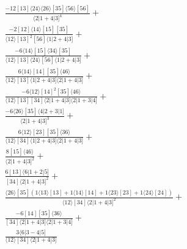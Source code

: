 \documentclass[varwidth, border=5pt]{standalone}
\begin{document}
\begin{my}
$\begin{gathered}
\scriptscriptstyle\frac{-12[13]⟨24⟩⟨26⟩[35]⟨56⟩[56]}{⟨2|1+4|3]^4}+\\
\scriptscriptstyle\frac{-2[12]⟨14⟩[15][35]}{⟨12⟩[13]^2[56]⟨1|2+4|3]}+\\
\scriptscriptstyle\frac{-6⟨14⟩[15]⟨34⟩[35]}{⟨12⟩[13]⟨24⟩[56]⟨1|2+4|3]}+\\
\scriptscriptstyle\frac{6⟨14⟩[14][35]⟨46⟩}{⟨12⟩[13]⟨1|2+4|3]⟨2|1+4|3]}+\\
\scriptscriptstyle\frac{-6⟨12⟩[14]^2[35]⟨46⟩}{⟨12⟩[13][34]⟨2|1+4|3]⟨2|1+3|4]}+\\
\scriptscriptstyle\frac{-6⟨26⟩[35]⟨4|2+3|1]}{⟨2|1+4|3]^3}+\\
\scriptscriptstyle\frac{6⟨12⟩[23][35]⟨36⟩}{⟨12⟩[34]⟨1|2+4|3]⟨2|1+4|3]}+\\
\scriptscriptstyle\frac{8[15]⟨46⟩}{⟨2|1+4|3]^2}+\\
\scriptscriptstyle\frac{6[13]⟨6|1+2|5]}{[34]⟨2|1+4|3]^2}+\\
\scriptscriptstyle\frac{⟨26⟩[35](1⟨13⟩[13]+1⟨14⟩[14]+1⟨23⟩[23]+1⟨24⟩[24])}{⟨12⟩[34]⟨2|1+4|3]^2}+\\
\scriptscriptstyle\frac{-6[14][35]⟨36⟩}{[34]⟨2|1+4|3]⟨2|1+3|4]}+\\
\scriptscriptstyle\frac{3⟨6|3-4|5]}{⟨12⟩[34]⟨2|1+4|3]}\phantom{+}
\end{gathered}$
\end{my}
\end{document}

